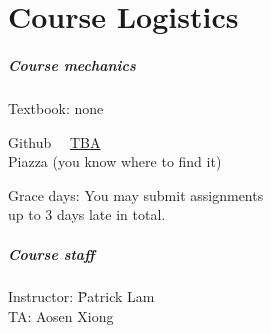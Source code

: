 \documentclass{beamer}
\newenvironment{changemargin}[1]{%
  \begin{list}{}{%
    \setlength{\topsep}{0pt}%
    \setlength{\leftmargin}{#1}%
    \setlength{\rightmargin}{1em}
    \setlength{\listparindent}{\parindent}%
    \setlength{\itemindent}{\parindent}%
    \setlength{\parsep}{\parskip}%
  }%
  \item[]}{\end{list}}
\begin{document}

\part{Course Logistics}
\begin{frame}
  \partpage
\end{frame}

\begin{frame}
\frametitle{Course mechanics}

\Large

\begin{changemargin}{1em}
  Textbook: none\\[1em]

{\small
  \begin{tabbing}
Github~~ \= \url{TBA}\\[1em]
Piazza \> (you know where to find it)
  \end{tabbing}
}

  Grace days: You may submit assignments \\ up to 3 days late in total.
\end{changemargin}

\end{frame}

\begin{frame}
\frametitle{Course staff}

\begin{changemargin}{2em}
\Large
{
  \begin{tabbing}
    Instructor:\hspace*{2em} \= Patrick Lam\\
    TA: \> Aosen Xiong \\
  \end{tabbing}
}
\end{changemargin}
\end{frame}
\end{document}
